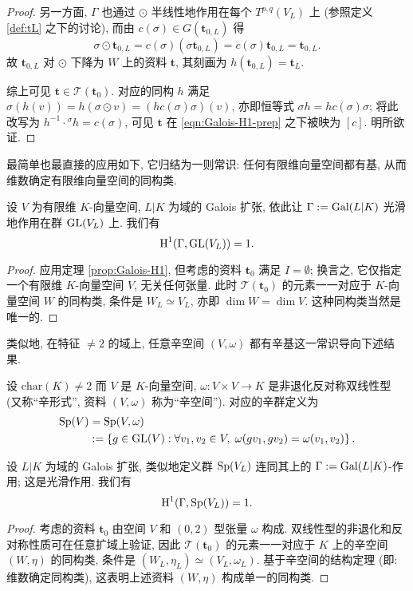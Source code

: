\begin{proof}
	另一方面, $\Gamma$ 也通过 $\odot$ 半线性地作用在每个 $T^{p, q} (V_L)$ 上 (参照定义 \ref{def:tL} 之下的讨论), 而由 $c(\sigma) \in G(\mathbf{t}_{0, L})$ 得
	\[ \sigma \odot \mathbf{t}_{0, L} = c(\sigma) (\sigma \mathbf{t}_{0, L}) = c(\sigma) \mathbf{t}_{0, L} = \mathbf{t}_{0, L}. \]
	故 $\mathbf{t}_{0, L}$ 对 $\odot$ 下降为 $W$ 上的资料 $\mathbf{t}$, 其刻画为 $h(\mathbf{t}_{0, L}) = \mathbf{t}_L$.
	
	综上可见 $\mathbf{t} \in \mathcal{T}(\mathbf{t}_0)$. 对应的同构 $h$ 满足 $\sigma(h(v)) = h (\sigma \odot v) = (h c(\sigma) \sigma)(v)$, 亦即恒等式 $\sigma h = h c(\sigma) \sigma$; 将此改写为 $h^{-1} \cdot {}^\sigma h = c(\sigma)$, 可见 $\mathbf{t}$ 在 \eqref{eqn:Galois-H1-prep} 之下被映为 $[c]$. 明所欲证.
\end{proof}

最简单也最直接的应用如下, 它归结为一则常识: 任何有限维向量空间都有基, 从而维数确定有限维向量空间的同构类.

\begin{theorem}[Hilbert 第 90 定理: $\GL$ 版本]\label{prop:Hilbert-90-GL}
	设 $V$ 为有限维 $K$-向量空间, $L|K$ 为域的 Galois 扩张, 依此让 $\Gamma := \operatorname{Gal}(L|K)$ 光滑地作用在群 $\operatorname{GL}(V_L)$ 上. 我们有
	\[ \operatorname{H}^1(\Gamma, \operatorname{GL}(V_L)) = 1. \]
\end{theorem}
\begin{proof}
	应用定理 \ref{prop:Galois-H1}, 但考虑的资料 $\mathbf{t}_0$ 满足 $I = \emptyset$; 换言之, 它仅指定一个有限维 $K$-向量空间 $V$, 无关任何张量. 此时 $\mathscr{T}(\mathbf{t}_0)$ 的元素一一对应于 $K$-向量空间 $W$ 的同构类, 条件是 $W_L \simeq V_L$, 亦即 $\dim W = \dim V$. 这种同构类当然是唯一的.
\end{proof}

类似地, 在特征 $\neq 2$ 的域上, 任意辛空间 $(V, \omega)$ 都有辛基这一常识导向下述结果.

\begin{theorem}
	设 $\mathrm{char}(K) \neq 2$ 而 $V$ 是 $K$-向量空间, $\omega: V \times V \to K$ 是非退化反对称双线性型 (又称``辛形式'', 资料 $(V, \omega)$ 称为``辛空间''). 对应的辛群定义为
	\begin{align*}
		\operatorname{Sp}(V) & = \operatorname{Sp}(V, \omega) \\
		& := \left\{g \in \operatorname{GL}(V): \forall v_1, v_2 \in V, \; \omega(gv_1, gv_2) = \omega(v_1, v_2) \right\}.
	\end{align*}

	设 $L|K$ 为域的 Galois 扩张, 类似地定义群 $\operatorname{Sp}(V_L)$ 连同其上的 $\Gamma := \operatorname{Gal}(L|K)$-作用; 这是光滑作用. 我们有
	\[ \operatorname{H}^1(\Gamma, \operatorname{Sp}(V_L)) = 1. \]
\end{theorem}
\begin{proof}
	考虑的资料 $\mathbf{t}_0$ 由空间 $V$ 和 $(0, 2)$ 型张量 $\omega$ 构成. 双线性型的非退化和反对称性质可在任意扩域上验证, 因此 $\mathscr{T}(\mathbf{t}_0)$ 的元素一一对应于 $K$ 上的辛空间 $(W, \eta)$ 的同构类, 条件是 $(W_L, \eta_L) \simeq (V_L, \omega_L)$. 基于辛空间的结构定理 (即: 维数确定同构类), 这表明上述资料 $(W, \eta)$ 构成单一的同构类.
\end{proof}

